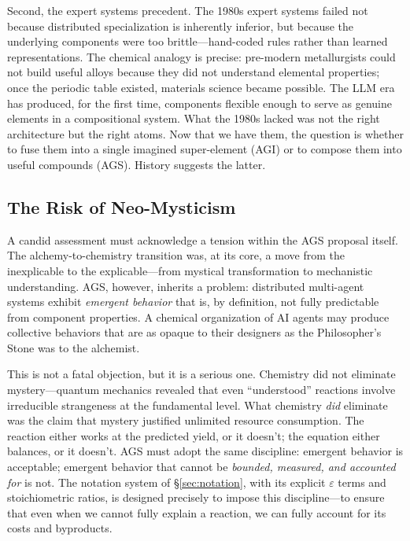 \documentclass[12pt]{article}
\begin{document}
Second, the expert systems precedent. The 1980s expert systems failed not because distributed specialization is inherently inferior, but because the underlying components were too brittle---hand-coded rules rather than learned representations. The chemical analogy is precise: pre-modern metallurgists could not build useful alloys because they did not understand elemental properties; once the periodic table existed, materials science became possible. The LLM era has produced, for the first time, components flexible enough to serve as genuine elements in a compositional system. What the 1980s lacked was not the right architecture but the right atoms. Now that we have them, the question is whether to fuse them into a single imagined super-element (AGI) or to compose them into useful compounds (AGS). History suggests the latter.

\subsection{The Risk of Neo-Mysticism}
\label{sec:neomysticism}

A candid assessment must acknowledge a tension within the AGS proposal itself. The alchemy-to-chemistry transition was, at its core, a move from the inexplicable to the explicable---from mystical transformation to mechanistic understanding. AGS, however, inherits a problem: distributed multi-agent systems exhibit \emph{emergent behavior} that is, by definition, not fully predictable from component properties. A chemical organization of AI agents may produce collective behaviors that are as opaque to their designers as the Philosopher's Stone was to the alchemist.

This is not a fatal objection, but it is a serious one. Chemistry did not eliminate mystery---quantum mechanics revealed that even ``understood'' reactions involve irreducible strangeness at the fundamental level. What chemistry \emph{did} eliminate was the claim that mystery justified unlimited resource consumption. The reaction either works at the predicted yield, or it doesn't; the equation either balances, or it doesn't. AGS must adopt the same discipline: emergent behavior is acceptable; emergent behavior that cannot be \emph{bounded, measured, and accounted for} is not. The notation system of \S\ref{sec:notation}, with its explicit $\varepsilon$ terms and stoichiometric ratios, is designed precisely to impose this discipline---to ensure that even when we cannot fully explain a reaction, we can fully account for its costs and byproducts.
\end{document}
